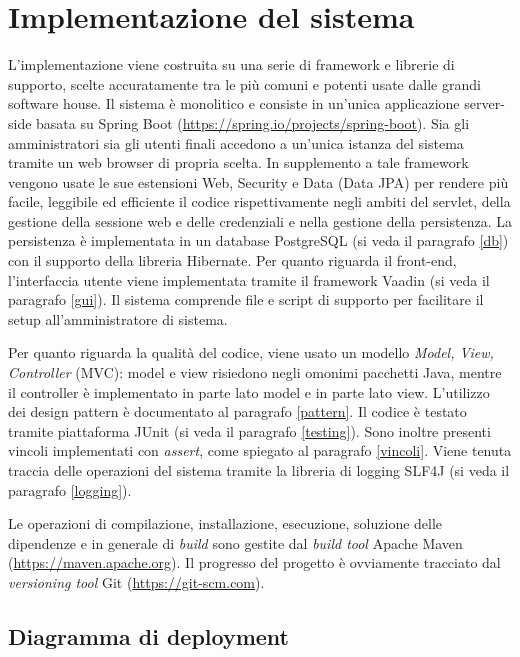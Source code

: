 \chapter{Implementazione del sistema}\label{implementazione}
L'implementazione viene costruita su una serie di framework e librerie di supporto, scelte accuratamente tra le più comuni e potenti usate dalle grandi software house. Il sistema è monolitico e consiste in un'unica applicazione server-side basata su Spring Boot (\url{https://spring.io/projects/spring-boot}). Sia gli amministratori sia gli utenti finali accedono a un'unica istanza del sistema tramite un web browser di propria scelta. In supplemento a tale framework vengono usate le sue estensioni Web, Security e Data (Data JPA) per rendere più facile, leggibile ed efficiente il codice rispettivamente negli ambiti del servlet, della gestione della sessione web e delle credenziali e nella gestione della persistenza. La persistenza è implementata in un database PostgreSQL (si veda il paragrafo \ref{db}) con il supporto della libreria Hibernate. Per quanto riguarda il front-end, l'interfaccia utente viene implementata tramite il framework Vaadin (si veda il paragrafo \ref{gui}). Il sistema comprende file e script di supporto per facilitare il setup all'amministratore di sistema.

Per quanto riguarda la qualità del codice, viene usato un modello \emph{Model, View, Controller} (MVC): model e view risiedono negli omonimi pacchetti Java, mentre il controller è implementato in parte lato model e in parte lato view. L'utilizzo dei design pattern è documentato al paragrafo \ref{pattern}. Il codice è testato tramite piattaforma JUnit (si veda il paragrafo \ref{testing}). Sono inoltre presenti vincoli implementati con \emph{assert}, come spiegato al paragrafo \ref{vincoli}. Viene tenuta traccia delle operazioni del sistema tramite la libreria di logging SLF4J (si veda il paragrafo \ref{logging}).

Le operazioni di compilazione, installazione, esecuzione, soluzione delle dipendenze e in generale di \emph{build} sono gestite dal \emph{build tool} Apache Maven (\url{https://maven.apache.org}). Il progresso del progetto è ovviamente tracciato dal \emph{versioning tool} Git (\url{https://git-scm.com}).




\section{Diagramma di deployment}\label{deployment}




